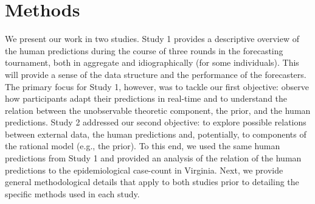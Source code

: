 \documentclass[a4paper,man,natbib]{apa6}
\begin{document}
\section{Methods}\label{methods}
We present our work in two studies.  Study 1 provides a descriptive overview of the human predictions during the course of three rounds in the forecasting tournament, both in aggregate and idiographically (for some individuals).  This will provide a sense of the data structure and the performance of the forecasters.  The primary focus for Study 1, however, was to tackle our first objective: observe how participants adapt their predictions in real-time and to understand the relation between the unobservable theoretic component, the prior, and the human predictions.  Study 2 addressed our second objective: to explore possible relations between external data, the human predictions and, potentially, to components of the rational model (e.g., the prior).  To this end, we used the same human predictions from Study 1 and provided an analysis of the relation of the human predictions to the epidemiological case-count in Virginia. Next, we provide general methodological details that apply to both studies prior to detailing the specific methods used in each study.
\end{document}
